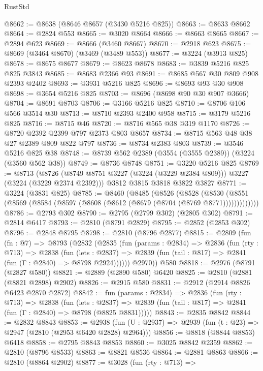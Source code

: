 \begin{lexlean}{RustStd}
\begin{coremodule}
@8662 := @8638 (@8646 @8657 (@3430 @5216 @825))
@8663 := @8633 @8662
@8664 := @2824 @553
@8665 := @3020 @8664
@8666 := @8663 @8665
@8667 := @2894 @623
@8669 := @8666 (@3460 @8667)
@8670 := @2918 @623
@8675 := @8669 (@3464 @8670) (@3469 (@3489 @553))
@8677 := @3224 (@3913 @825)
@8678 := @8675 @8677
@8679 := @8623 @8678
@8683 := @3839 @5216 @825 @825 @3843
@8685 := @8683 @2366 @93
@8691 := @8685 @567 @30 @809 @908 @2393 @2402
@8693 := @3931 @5216 @825
@8696 := @8693 @93 @30 @908
@8698 := @3654 @5216 @825
@8703 := @8696 (@8698 @90 @30 @907 @3666)
@8704 := @8691 @8703
@8706 := @3166 @5216 @825
@8710 := @8706 @106 @566 @3514 @30
@8713 := @8710 @2393 @2400 @958
@8715 := @3179 @5216 @825
@8716 := @8715 @46
@8720 := @8716 @565 @38 @319 @1170
@8726 := @8720 @2392 @2399 @797 @2373 @803 @8657
@8734 := @8715 @563 @48 @38 @27 @2389 @809 @822 @797
@8736 := @8734 @2383 @803
@8739 := @3546 @5216 @825 @38
@8748 := @8739 @562 @2389 (@3554 (@3555 @2389)) (@3224 (@3560 @562 @38))
@8749 := @8736 @8748
@8751 := @3220 @5216 @825
@8769 := @8713
    (@8726 (@8749 @8751 @3227 (@3224 (@3229 @2384 @809))) @3227 (@3224 (@3229 @2374 @2392)))
    @3812
    @3815
    @3818
    @3822
    @3827
@8771 := @3224 (@3831 @825)
@8785 := @8460
    (@8485
      (@8526
        (@8528
          (@8530 (@8551 (@8569 (@8584 (@8597 (@8608 (@8612 (@8679 (@8704 (@8769 @8771)))))))))))))
@8786 := @2793 @302
@8790 := @2795 (@2799 @302) (@2805 @302)
@8791 := @2814 @6417
@8793 := @2810 (@8791 @2829)
@8795 := @2852 (@2853 @302)
@8796 := @2848 @8795
@8798 := @2810 (@8796 @2877)
@8815 := @2809
    (fun (fn : @7) =>
    @8793
      (@2832
        (@2835
          (fun (params : @2834) =>
          @2836
            (fun (rty : @713) =>
            @2838
              (fun (lets : @2837) =>
              @2839 (fun (tail : @817) => @2841 (fun (Γ : @2840) => @8798 @2924))))))
        @2970))
    @580
@8818 := @2976 (@8791 (@2827 @580))
@8821 := @2889 (@2890 @580) @6420
@8825 := @2810 (@2881 (@8821 @2898) @2902)
@8826 := @2915 @580
@8831 := @2912 (@2914 @8826 @6423 @2870 @2872)
@8842 := fun (params : @2834) =>
  @2836
    (fun (rty : @713) =>
    @2838
      (fun (lets : @2837) =>
      @2839 (fun (tail : @817) => @2841 (fun (Γ : @2840) => @8798 (@8825 @8831)))))
@8843 := @2835 @8842
@8844 := @2832 @8843
@8853 := @2938 (fun (U : @2937) => @2939 (fun (t : @23) => @2947 (@2810 (@2953 @6420 @2828) @2964)))
@8856 := @8818 (@8844 @8853) @6418
@8858 := @2795 @8843 @8853
@8860 := @3025 @8842 @2359
@8862 := @2810 (@8796 @8533)
@8863 := @8821 @8536
@8864 := @2881 @8863
@8866 := @2810 (@8864 @2902)
@8877 := @3028
    (fun (rty : @713) =>

\end{coremodule}
\end{lexlean}
